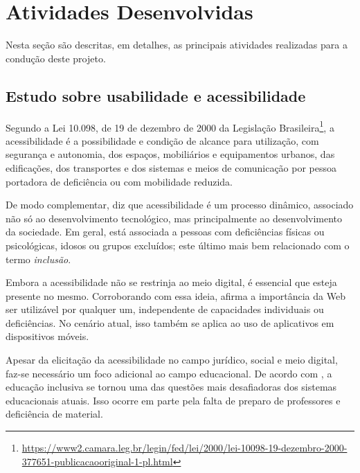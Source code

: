 \chapter{Atividades Desenvolvidas}\label{sec:ativ_desenvolvidas}
Nesta seção são descritas, em detalhes, as principais atividades realizadas para a condução deste projeto.


\section{Estudo sobre usabilidade e acessibilidade}\label{sec:estudos_usab_acess} 


Segundo a Lei 10.098, de 19 de dezembro de 2000 da Legislação Brasileira\footnote{\url{https://www2.camara.leg.br/legin/fed/lei/2000/lei-10098-19-dezembro-2000-377651-publicacaooriginal-1-pl.html}}, a acessibilidade é a possibilidade e condição de alcance para utilização, com segurança e autonomia, dos
espaços, mobiliários e equipamentos urbanos, das edificações, dos transportes e dos sistemas e meios de comunicação por pessoa portadora de deficiência ou com mobilidade reduzida. 

De modo complementar, \cite{torres2002acessibilidade} diz que acessibilidade é um processo dinâmico, associado não só ao desenvolvimento tecnológico, mas principalmente ao desenvolvimento da sociedade. Em geral, está associada a pessoas com deficiências físicas ou psicológicas, idosos ou grupos excluídos; este último mais bem relacionado com o termo \textit{inclusão}. 

Embora a acessibilidade não se restrinja ao meio digital, é essencial que esteja presente no mesmo. Corroborando com essa ideia, \cite{leew3c} afirma a importância da Web ser utilizável por qualquer um, independente de capacidades individuais ou deficiências. No cenário atual, isso também se aplica ao uso de aplicativos em dispositivos móveis.

Apesar da elicitação da acessibilidade no campo jurídico, social e meio digital, faz-se necessário um foco adicional ao campo educacional. De acordo com \cite{Bine2018DigitalIT}, a educação inclusiva se tornou uma das questões mais desafiadoras dos sistemas educacionais atuais. Isso ocorre em parte pela falta de preparo de professores e deficiência de material.

